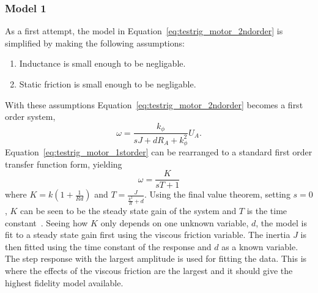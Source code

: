 \subsubsection{Model 1}
As a first attempt, the model in Equation~\ref{eq:testrig_motor_2ndorder} is 
simplified by making the following assumptions:
\begin{enumerate}
    \item Inductance is small enough to be negligable.
    \item Static friction is small enough to be negligable.
\end{enumerate}
With these assumptions
Equation~\ref{eq:testrig_motor_2ndorder} becomes a first order system,
\begin{equation} \label{eq:testrig_motor_1storder}
    \omega = \frac {k_{\phi}} {sJ + d R_A + k_{\phi}^2} U_A.
\end{equation}
Equation~\ref{eq:testrig_motor_1storder} can be rearranged to a standard first
order transfer function form, yielding
\begin{equation} \label{eq:testrig_motor_1storder_rewrite}
    \omega = \frac {K} {s T + 1}
\end{equation}
where $K = k(1 + \frac{1} {R d})$ and $T = \frac {J} {\frac{k^2} {R} + d}$.
Using the final value theorem, setting $s = 0$, $K$ can be seen to be the steady
state gain of the system and $T$ is the time constant~\cite{reglerteknik2006}.
Seeing how $K$ only depends on one unknown variable, $d$, the model is fit to a
steady state gain first using the viscous friction variable. The inertia $J$ is
then fitted using the time constant of the response and $d$ as a known variable.
The step response with the largest amplitude is used for fitting the data. This
is where the effects of the viscous friction are the largest and it should give
the highest fidelity model available. 

